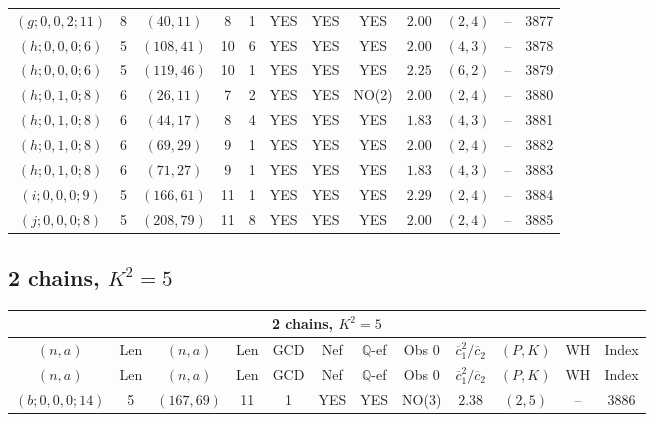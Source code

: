 \begin{longtable}{|c|c|c|c|c|c|c|c|c|c|c|c|}
$(g;0,0,2;11)$ & 8 & $(40,11)$ & 8 & 1 & YES & YES & YES & $2.00$ & $(2,4)$ & -- & 3877\\
$(h;0,0,0;6)$ & 5 & $(108,41)$ & 10 & 6 & YES & YES & YES & $2.00$ & $(4,3)$ & -- & 3878\\
$(h;0,0,0;6)$ & 5 & $(119,46)$ & 10 & 1 & YES & YES & YES & $2.25$ & $(6,2)$ & -- & 3879\\
$(h;0,1,0;8)$ & 6 & $(26,11)$ & 7 & 2 & YES & YES & NO(2) & $2.00$ & $(2,4)$ & -- & 3880\\
$(h;0,1,0;8)$ & 6 & $(44,17)$ & 8 & 4 & YES & YES & YES & $1.83$ & $(4,3)$ & -- & 3881\\
$(h;0,1,0;8)$ & 6 & $(69,29)$ & 9 & 1 & YES & YES & YES & $2.00$ & $(2,4)$ & -- & 3882\\
$(h;0,1,0;8)$ & 6 & $(71,27)$ & 9 & 1 & YES & YES & YES & $1.83$ & $(4,3)$ & -- & 3883\\
$(i;0,0,0;9)$ & 5 & $(166,61)$ & 11 & 1 & YES & YES & YES & $2.29$ & $(2,4)$ & -- & 3884\\
$(j;0,0,0;8)$ & 5 & $(208,79)$ & 11 & 8 & YES & YES & YES & $2.00$ & $(2,4)$ & -- & 3885
\end{longtable}
\subsection{2 chains, $K^2 = 5$}
\begin{longtable}{|c|c|c|c|c|c|c|c|c|c|c|c|}
\hline
\multicolumn{12}{|c|}{2 chains, $K^2 = 5$}\\
\hline
$(n,a)$ & Len & $(n,a)$ & Len & GCD & Nef & $\mathbb Q$-ef & Obs 0 & $\overline c_1^2 / \overline c_2$ & $(P,K)$ & WH & Index\\
\hline
\endfirsthead

\hline
$(n,a)$ & Len & $(n,a)$ & Len & GCD & Nef & $\mathbb Q$-ef & Obs 0 & $\overline c_1^2 / \overline c_2$ & $(P,K)$ & WH & Index\\
\hline
\endhead
\hline
\endfoot

$(b;0,0,0;14)$ & 5 & $(167,69)$ & 11 & 1 & YES & YES & NO(3) & $2.38$ & $(2,5)$ & -- & 3886
\end{longtable}
